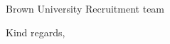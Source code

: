 \documentclass[11pt]{letter}
\begin{document}
\begin{letter}{Brown University Recruitment team}
  \closing{Kind regards,}

  
\end{letter}
\end{document}
